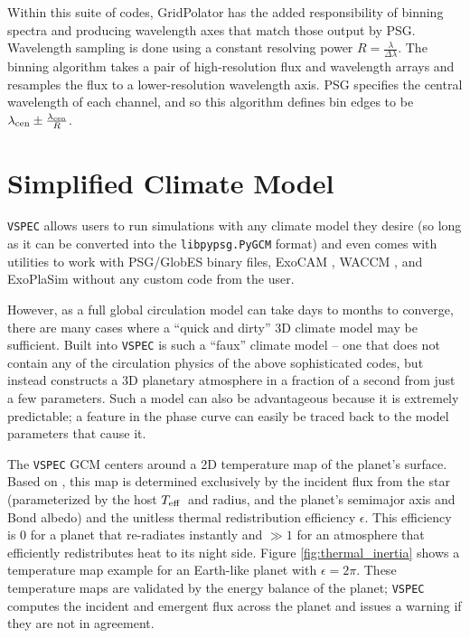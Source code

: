 \documentclass[linenumbers,preprint,authoryear]{elsarticle}
\newcommand{\teff}{$T_{\rm eff}$}
\newcommand{\vspec}[1]{\texttt{VSPEC}#1}
\begin{document}
Within this suite of codes, GridPolator has the added responsibility of binning spectra and producing wavelength axes that match those output by PSG. Wavelength sampling is done using a constant resolving power $R=\frac{\lambda}{\Delta \lambda}$. The binning algorithm takes a pair of high-resolution flux and wavelength arrays and resamples the flux to a lower-resolution wavelength axis. PSG specifies the central wavelength of each channel, and so this algorithm defines bin edges to be $\lambda_{\rm cen} \pm \frac{\lambda_{\rm cen}}{R}$.

\section{Simplified Climate Model}
\label{sec:vspec-gcm}
\vspec{} allows users to run simulations with any climate model they desire (so long as it can be converted into the \texttt{libpypsg.PyGCM} format) and even comes with utilities to work with PSG/GlobES binary files, ExoCAM \citep{wolf2022}, WACCM \citep{marsh2013}, and ExoPlaSim \citep{paradise2022} without any custom code from the user.

However, as a full global circulation model can take days to months to converge, there are many cases where a ``quick and dirty'' 3D climate model may be sufficient. Built into \vspec{} is such a ``faux'' climate model -- one that does not contain any of the circulation physics of the above sophisticated codes, but instead constructs a 3D planetary atmosphere in a fraction of a second from just a few parameters. Such a model can also be advantageous because it is extremely predictable; a feature in the phase curve can easily be traced back to the model parameters that cause it.

The \vspec{} GCM centers around a 2D temperature map of the planet's surface. Based on \citet{cowan2011}, this map
is determined exclusively by the incident flux from the star (parameterized by the host \teff~and radius,
and the planet's semimajor axis and Bond albedo) and the unitless thermal redistribution efficiency $\epsilon$.
This efficiency is 0 for a planet that re-radiates instantly and $\gg 1$ for an atmosphere that efficiently redistributes heat to its night side. Figure \ref{fig:thermal_inertia} shows a temperature map example for an Earth-like planet with $\epsilon = 2\pi$. These temperature maps are validated by the energy balance of the planet; \vspec{} computes the incident and emergent flux across the planet and issues a warning if they are not in agreement.
\end{document}
